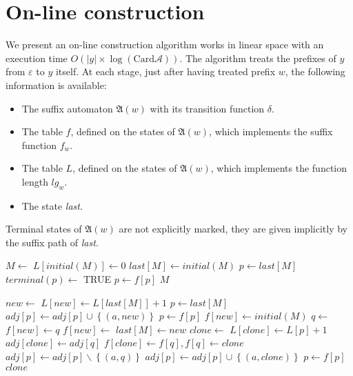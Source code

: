\documentclass[11pt]{report}
\begin{document}
\section{On-line construction}
We present an on-line construction algorithm works in linear space
with an execution time $O(|y| \times \log(\text{Card}\mathcal{A}))$.
The algorithm treats the prefixes of $y$ from $\varepsilon$ to $y$
itself. At each stage, just after having treated prefix $w$, the
following information is available:
\begin{itemize}
\item The suffix automaton $\mathfrak{A}(w)$ with its transition
  function $\delta$.
\item The table $f$, defined on the states of $\mathfrak{A}(w)$, which
  implements the suffix function $f_w$.
\item The table $L$, defined on the states of $\mathfrak{A}(w)$, which
  implements the function length $lg_w$.
\item The state \textit{last}.
\end{itemize}
Terminal states of $\mathfrak{A}(w)$ are not explicitly marked, they
are given implicitly by the suffix path of \textit{last}. 
\begin{algorithmic}
  \State $M \gets $ 
  \State $L[initial(M)] \gets 0$
  \State $last[M] \gets initial(M)$
  \State {}
  \EndFor
  \State $p \gets last[M]$
  \Repeat
  \State $terminal(p) \gets $ TRUE
  \State $p \gets f[p]$
  \State \Return $M$
  \EndFunction
  \State
\end{algorithmic}
\newpage
\begin{algorithmic}
  \State $new \gets$ 
  \State $L[new] \gets L[last[M]] + 1$
  \State $p \gets last[M]$
  \Repeat
  \State $adj[p] \gets adj[p] \cup \left\{(a, new)\right\}$
  \State $p \gets f[p]$
  \State $f[new] \gets initial(M)$
  \Else
  \State $q \gets$ 
  \State $f[new] \gets q$
  \Else
  \State $f[new] \gets$ 
  \EndIf
  \EndIf
  \State $last[M] \gets new$
  \EndFunction
  \State
  \State
  \State $clone \gets$ 
  \State $L[clone] \gets L[p] + 1$
  \State $adj[clone] \gets adj[q]$
  \State $f[clone] \gets f[q], f[q] \gets clone$
  \Repeat
  \State $adj[p] \gets adj[p] \backslash \left\{(a,q)\right\}$
  \State $adj[p] \gets adj[p] \cup \left\{(a,clone)\right\}$
  \State $p \gets f[p]$
  \State \Return $clone$
  \EndFunction
\end{algorithmic}
\end{document}
